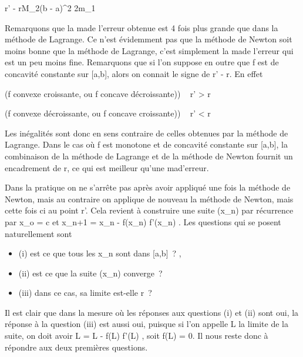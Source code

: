 \documentclass[]{article}
\begin{document}
\textbar{}r' - r\textbar{}\leq M\_2(b - a)^2
\over 2m\_1

Remarquons que la ma\jmathoration de l'erreur obtenue est 4 fois plus grande
que dans la méthode de Lagrange. Ce n'est évidemment pas que la méthode
de Newton soit moins bonne que la méthode de Lagrange, c'est simplement
la ma\jmathoration de l'erreur qui est un peu moins fine. Remarquons que si
l'on suppose en outre que f est de concavité constante sur {[}a,b{]},
alors on connait le signe de r' - r. En effet

(f convexe croissante, ou f concave décroissante)) \rigtharrow~ r' \textgreater{} r

(f convexe décroissante, ou f concave croissante)) \rigtharrow~ r' \textless{} r

Les inégalités sont donc en sens contraire de celles obtenues par la
méthode de Lagrange. Dans le cas où f est monotone et de concavité
constante sur {[}a,b{]}, la combinaison de la méthode de Lagrange et de
la méthode de Newton fournit un encadrement de r, ce qui est meilleur
qu'une ma\jmathoration d'erreur.

Dans la pratique on ne s'arrête pas après avoir appliqué une fois la
méthode de Newton, mais au contraire on applique de nouveau la méthode
de Newton, mais cette fois ci au point r'. Cela revient à construire une
suite (x\_n) par récurrence par x\_o = c et
x\_n+1 = x\_n - f(x\_n) \over
f'(x\_n) . Les questions qui se posent naturellement sont

\begin{itemize}
\itemsep1pt\parskip0pt
\item
  (i) est ce que tous les x\_n sont dans {[}a,b{]}~? ,
\item
  (ii) est ce que la suite (x\_n) converge~?
\item
  (iii) dans ce cas, sa limite est-elle r~?
\end{itemize}

Il est clair que dans la mesure où les réponses aux questions (i) et
(ii) sont oui, la réponse à la question (iii) est aussi oui, puisque si
l'on appelle L la limite de la suite, on doit avoir L = L - f(L)
\over f'(L) , soit f(L) = 0. Il nous reste donc à
répondre aux deux premières questions.
\end{document}
